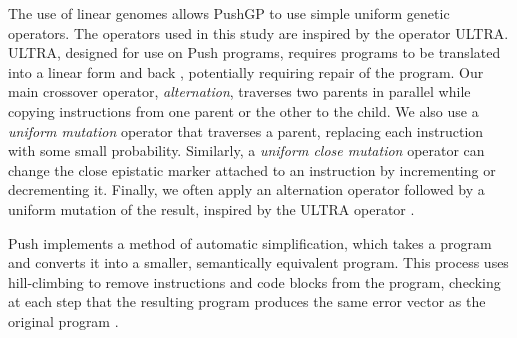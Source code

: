 The use of linear genomes allows PushGP to use simple uniform genetic operators. The operators used in this study are inspired by the operator ULTRA. ULTRA, designed for use on Push programs, requires programs to be translated into a linear form and back \citep{Spector:2013:GPTP}, potentially requiring repair of the program. Our main crossover operator, \textit{alternation}, traverses two parents in parallel while copying instructions from one parent or the other to the child.
We also use a \textit{uniform mutation} operator that traverses a parent, replacing each instruction with some small probability. Similarly, a \textit{uniform close mutation} operator can change the close epistatic marker attached to an instruction by incrementing or decrementing it. Finally, we often apply an alternation operator followed by a uniform mutation of the result, inspired by the ULTRA operator \citep{Spector:2013:GPTP}.

Push implements a method of automatic simplification, which takes a program and converts it into a smaller, semantically equivalent program. This process uses hill-climbing to remove instructions and code blocks from the program, checking at each step that the resulting program produces the same error vector as the original program \citep{Spector:2014:GECCOcomp}.





